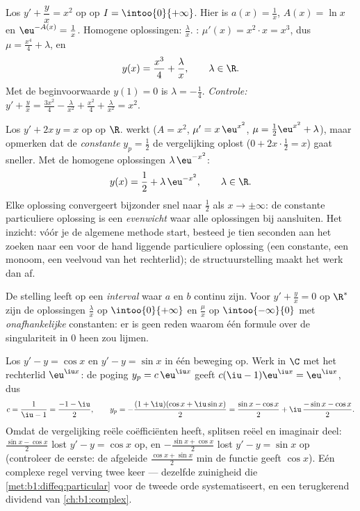\begin{example}\label{ex:b1:diffeq:order1}
Los $y' + \dfrac{y}{x} = x^2$ op op $I = \intoo{0}{+\infty}$. Hier is
$a(x) = \frac 1x$, $A(x) = \ln x$ en $\eu^{-A(x)} = \frac 1x$. Homogene
oplossingen: $\frac{\lambda}{x}$. : $\mu'(x) = x^2
\cdot x = x^3$, dus $\mu = \frac{x^4}{4} + \lambda$, en
\[
y(x) = \frac{x^3}{4} + \frac{\lambda}{x}, \qquad \lambda \in \R .
\]
Met de beginvoorwaarde $y(1) = 0$ is $\lambda = -\frac14$.
\emph{Controle:} $y' + \frac yx = \frac{3x^2}{4} - \frac{\lambda}{x^2} +
\frac{x^2}{4} + \frac{\lambda}{x^2} = x^2$.
\end{example}

\begin{example}\label{ex:b1:diffeq:guess}
Los $y' + 2x\,y = x$ op op $\R$.  werkt ($A =
x^2$, $\mu' = x\,\eu^{x^2}$, $\mu = \frac12\eu^{x^2} + \lambda$), maar
opmerken dat de \emph{constante} $y_p = \frac12$ de vergelijking oplost
($0 + 2x\cdot\frac12 = x$) gaat sneller. Met de homogene oplossingen
$\lambda\,\eu^{-x^2}$:
\[
y(x) = \frac12 + \lambda\,\eu^{-x^2}, \qquad \lambda \in \R .
\]
Elke oplossing convergeert bijzonder snel naar $\frac12$ als $x \to
\pm\infty$: de constante particuliere oplossing is een
\emph{evenwicht} waar alle oplossingen bij aansluiten. Het inzicht: vóór
je de algemene methode start, besteed je tien seconden aan het zoeken
naar een voor de hand liggende particuliere oplossing (een constante, een
monoom, een veelvoud van het rechterlid); de structuurstelling maakt het
werk dan af.
\end{example}

\begin{remark}
De stelling leeft op een \emph{interval} waar $a$ en $b$ continu zijn.
Voor $y' + \frac yx = 0$ op $\R^*$ zijn de oplossingen
$\frac{\lambda}{x}$ op $\intoo{0}{+\infty}$ en $\frac{\mu}{x}$ op
$\intoo{-\infty}{0}$ met \emph{onafhankelijke} constanten: er is geen
reden waarom één formule over de singulariteit in $0$ heen zou lijmen.
\end{remark}

\begin{example}\label{ex:b1:diffeq:complexrhs}
Los $y' - y = \cos x$ en $y' - y = \sin x$ in één beweging op. Werk in
$\C$ met het rechterlid $\eu^{\iu x}$: de poging $y_p = c\,\eu^{\iu x}$
geeft $c(\iu - 1)\eu^{\iu x} = \eu^{\iu x}$, dus
\[
c = \frac1{\iu - 1} = \frac{-1 - \iu}2,
\qquad
y_p = -\frac{(1 + \iu)(\cos x + \iu\sin x)}2
= \frac{\sin x - \cos x}2 + \iu\,\frac{-\sin x - \cos x}2 .
\]
Omdat de vergelijking reële coëfficiënten heeft, splitsen reëel en
imaginair deel: $\frac{\sin x - \cos x}2$ lost $y' - y = \cos x$ op, en
$-\frac{\sin x + \cos x}2$ lost $y' - y = \sin x$ op (controleer de
eerste: de afgeleide $\frac{\cos x + \sin x}2$ min de functie geeft
$\cos x$). Eén complexe regel verving twee keer 
--- dezelfde zuinigheid die \cref{met:b1:diffeq:particular} voor de
tweede orde systematiseert, en een terugkerend dividend van
\cref{ch:b1:complex}.
\end{example}

